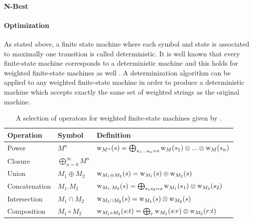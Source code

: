 \paragraph{N-Best}

\paragraph{Optimization} As stated above, a finite state machine where
each symbol and state is associated to maximally one transition is
called deterministic. It is well known that every finite-state machine
corresponds to a deterministic machine and this holds for weighted
finite-state machines as well \citep{Mohri2002}. A determinization
algorithm can be applied to any weighted finite-state machine in order
to produce a deterministic machine which accepts exactly the same set
of weighted strings as the original machine.

\begin{table}[!ftb]
\begin{center}
\begin{tabular}{lll}
Operation & Symbol & Definition \\
\hline
Power & $M^n$ & $\mbox{${\rm w}$}_{M^n}(s) = \bigoplus_{s_1 ... s_n = s} \mbox{${\rm w}$}_{M}(s_1) \otimes ... \otimes \mbox{${\rm w}$}_{M}(s_n)$\\ 
Closure & $\bigoplus_{n = 0}^\infty M^n$ &  \\
Union & $M_1 \oplus M_2$ & $\mbox{${\rm w}$}_{M_1 \oplus M_2}(s) = \mbox{${\rm w}$}_{M_1}(s) \oplus \mbox{${\rm w}$}_{M_2}(s)$\\ 
Concatenation & $M_1.M_2$ & $\mbox{${\rm w}$}_{M_1.M_2}(s) = \bigoplus_{s_1s_2 = s} \mbox{${\rm w}$}_{M_1}(s_1) \otimes \mbox{${\rm w}$}_{M_2}(s_2)$\\
Intersection & $M_1 \cap M_2$ & $\mbox{${\rm w}$}_{M_1 \cap M_2}(s) = \mbox{${\rm w}$}_{M_1}(s) \otimes \mbox{${\rm w}$}_{M_2}(s)$ \\
Composition & $M_1 \circ M_2$ & $\mbox{${\rm w}$}_{M_1 \circ M_2}(s{\rm :}t) = \bigoplus_{r} \mbox{${\rm w}$}_{M_1}(s{\rm :}r) \otimes \mbox{${\rm w}$}_{M_2}(r{\rm :}t)$\\
\end{tabular}
\caption{A selection of operators for weighted finite-state machines
  given by
  \cite{Allauzen2007}.}\label{tab:fs-algebra}
\end{center}
\end{table}


